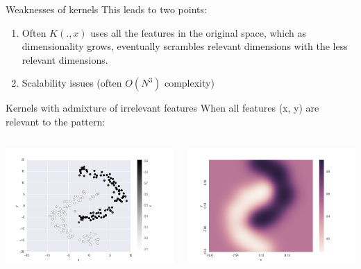 \documentclass[11pt]{beamer}
\begin{document}
\begin{frame}{Weaknesses of kernels}
This leads to two points:
\begin{enumerate}
\item Often $K(., x)$ uses all the features in the original space, which as dimensionality grows, eventually scrambles relevant dimensions with the less relevant dimensions. 
\item Scalability issues (often $O(N^3)$ complexity)
\end{enumerate}
\end{frame}

\begin{frame}{Kernels with admixture of irrelevant features}
When all features (x, y) are relevant to the pattern:
\begin{columns}
\includegraphics[scale=0.3]{kernel_dim_scale_0.png} 

\includegraphics[scale=0.3]{kernel_dim_scale_0_hp.png} 

\end{columns}
\end{frame}
\end{document}
